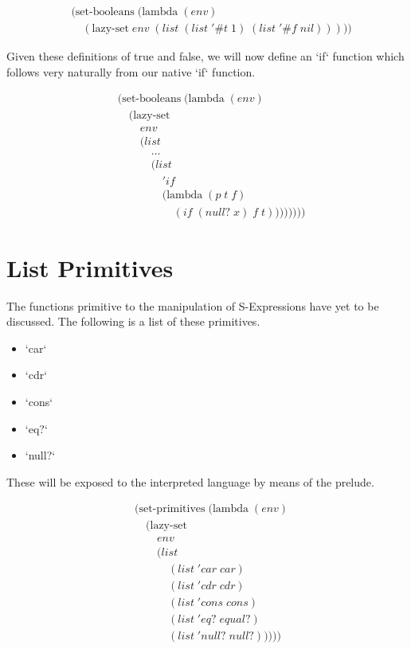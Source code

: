 \begin{align*}
& (\text{set-booleans} \; (\text{lambda} \; (env)
\\& \quad (\text{lazy-set} \; env \; (list \; (list \; '\#t \; 1) \; (list \; '\#f \; nil)))))
\end{align*}

Given these definitions of true and false, we will now define an `if` function which follows very naturally from our native `if` function.

\begin{align*}
& (\text{set-booleans} \; (\text{lambda} \; (env) \; 
\\& \quad (\text{lazy-set} \; 
\\& \qquad env
\\& \qquad (list \; 
\\& \qquad \quad \dots
\\& \qquad \quad (list
\\& \qquad \qquad 'if \; 
\\& \qquad \qquad (\text{lambda} \; (p \; t \; f)
\\& \qquad \qquad \quad (if \; (null? \; x) \; f \; t))))))))
\end{align*}

\section{List Primitives}
The functions primitive to the manipulation of S-Expressions have yet to be discussed. The following is a list of these primitives.

\begin{itemize}
  \item `car`
  \item `cdr`
  \item `cons`
  \item `eq?`
  \item `null?`
\end{itemize}

These will be exposed to the interpreted language by means of the prelude.

\begin{align*}
& (\text{set-primitives} \; (\text{lambda} \; (env)
\\& \quad (\text{lazy-set}
\\& \qquad env
\\& \qquad (list
\\& \qquad \quad (list \; 'car \; car)
\\& \qquad \quad (list \; 'cdr \; cdr)
\\& \qquad \quad (list \; 'cons \; cons)
\\& \qquad \quad (list \; 'eq? \; equal?)
\\& \qquad \quad (list \; 'null? \; null?)))))
\end{align*}

